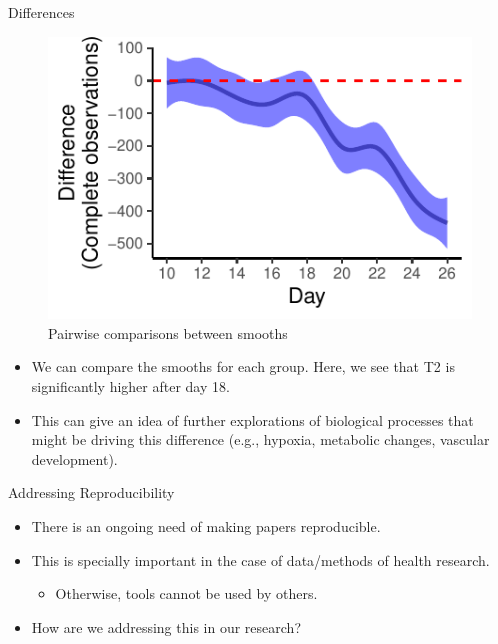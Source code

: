 \documentclass[
  ignorenonframetext,
]{beamer}
\providecommand{\tightlist}{%
  \setlength{\itemsep}{0pt}\setlength{\parskip}{0pt}}\usepackage{longtable,booktabs,array}
\begin{document}
\begin{frame}{Differences}
\protect\hypertarget{differences}{}
\begin{figure}

{\centering \includegraphics{MfPH_Next_Generation_AM_March_2023_files/figure-beamer/differences-1.pdf}

}

\caption{Pairwise comparisons between smooths}

\end{figure}

\begin{itemize}[<+->]
\item
  We can compare the smooths for each group. Here, we see that T2 is
  significantly higher after \approx day 18.
\item
  This can give an idea of further explorations of biological processes
  that might be driving this difference (e.g., hypoxia, metabolic
  changes, vascular development).
\end{itemize}
\end{frame}

\begin{frame}{Addressing Reproducibility}
\protect\hypertarget{addressing-reproducibility}{}
\begin{itemize}[<+->]
\item
  There is an ongoing need of making papers reproducible.
\item
  This is specially important in the case of data/methods of health
  research.

  \begin{itemize}[<+->]
  \tightlist
  \item
    Otherwise, tools cannot be used by others.
  \end{itemize}
\item
  How are we addressing this in our research?
\end{itemize}
\end{frame}
\end{document}
